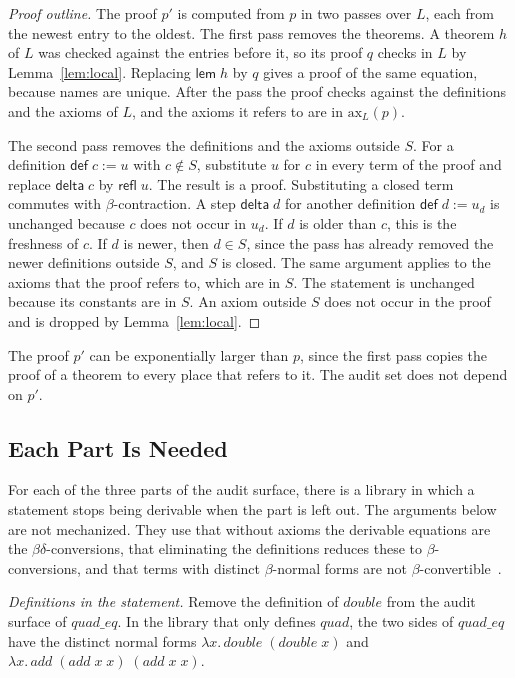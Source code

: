 \documentclass[acmsmall,nonacm,screen]{acmart}
\newcommand{\kw}[1]{\mathsf{#1}}
\newcommand{\nm}[1]{\mathit{#1}}
\newcommand{\axs}{\mathrm{ax}}
\begin{document}
\begin{proof}[Proof outline]
The proof $p'$ is computed from $p$ in two passes over $L$, each from the newest entry to the
oldest. The first pass removes the theorems. A theorem $h$ of $L$ was checked against the entries
before it, so its proof $q$ checks in $L$ by Lemma~\ref{lem:local}. Replacing $\kw{lem}\;h$ by
$q$ gives a proof of the same equation, because names are unique. After the pass the proof checks
against the definitions and the axioms of $L$, and the axioms it refers to are in $\axs_L(p)$.

The second pass removes the definitions and the axioms outside $S$. For a definition
$\kw{def}\;c := u$ with $c \notin S$, substitute $u$ for $c$ in every term of the proof and
replace $\kw{delta}\;c$ by $\kw{refl}\;u$. The result is a proof. Substituting a closed term
commutes with $\beta$-contraction. A step $\kw{delta}\;d$ for another definition
$\kw{def}\;d := u_d$ is unchanged because $c$ does not occur in $u_d$. If $d$ is older than
$c$, this is the freshness of $c$. If $d$ is newer, then $d \in S$, since the pass has already
removed the newer definitions outside $S$, and $S$ is closed. The same argument applies to the
axioms that the proof refers to, which are in $S$. The statement is unchanged because its
constants are in $S$. An axiom outside $S$ does not occur in the proof and is dropped by
Lemma~\ref{lem:local}.
\end{proof}

The proof $p'$ can be exponentially larger than $p$, since the first pass copies the proof of a
theorem to every place that refers to it. The audit set does not depend on $p'$.

\subsection{Each Part Is Needed}
\label{sec:necessity}

For each of the three parts of the audit surface, there is a library in which a statement stops
being derivable when the part is left out. The arguments below are not mechanized. They use that
without axioms the derivable equations are the $\beta\delta$-conversions, that eliminating the
definitions reduces these to $\beta$-conversions, and that terms with distinct $\beta$-normal
forms are not $\beta$-convertible~\citep{church1936}.

\emph{Definitions in the statement.} Remove the definition of $\nm{double}$ from the audit
surface of $\nm{quad\_eq}$. In the library that only defines $\nm{quad}$, the two sides of
$\nm{quad\_eq}$ have the distinct normal forms $\lambda x.\,\nm{double}\;(\nm{double}\;x)$ and
$\lambda x.\,\nm{add}\;(\nm{add}\;x\;x)\;(\nm{add}\;x\;x)$.
\end{document}
